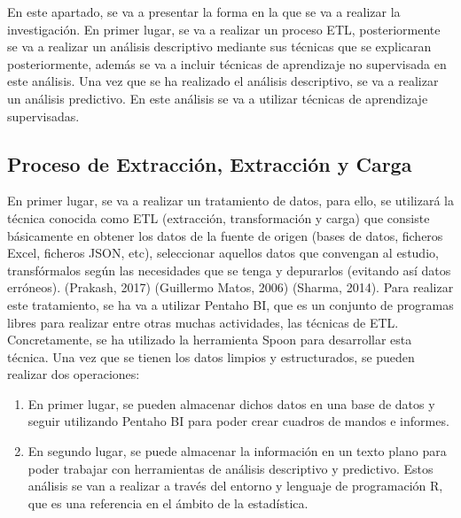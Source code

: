 \documentclass[spanish,12pt, a4paper,twoside]{paper}
\begin{document}

\justify
En este apartado, se va a presentar la forma en la que se va a realizar la investigación. En primer lugar, se va a realizar un proceso ETL, posteriormente se va a realizar un análisis descriptivo mediante sus técnicas que se explicaran posteriormente, además se va a incluir técnicas de aprendizaje no supervisada en este análisis.
Una vez que se ha realizado el análisis descriptivo, se va a realizar un análisis predictivo. En este análisis se va a utilizar técnicas de aprendizaje supervisadas.

\subsection{Proceso de Extracción, Extracción y Carga}
\justify
En primer lugar, se va a realizar un tratamiento de datos, para ello, se utilizará la técnica conocida como ETL (extracción, transformación y carga) que consiste básicamente en obtener los datos de la fuente de origen (bases de datos, ficheros Excel, ficheros JSON, etc), seleccionar aquellos datos que convengan al estudio, transfórmalos según las necesidades que se tenga y depurarlos (evitando así datos erróneos). (Prakash, 2017) (Guillermo Matos, 2006) (Sharma, 2014).
Para realizar este tratamiento, se ha va a utilizar Pentaho BI, que es un conjunto de programas libres para realizar entre otras muchas actividades, las técnicas de ETL. Concretamente, se ha utilizado la herramienta Spoon para desarrollar esta técnica. 
Una vez que se tienen los datos limpios y estructurados, se pueden realizar dos operaciones:
\justify
\begin{enumerate}
\item  En primer lugar, se pueden almacenar dichos datos en una base de datos y seguir utilizando Pentaho BI para poder crear cuadros de mandos e informes. 
\item  En segundo lugar, se puede almacenar la información en un texto plano para poder trabajar con herramientas de análisis descriptivo y predictivo. Estos análisis se van a realizar a través del entorno y lenguaje de programación R, que es una referencia en el ámbito de la estadística.
\end{enumerate}
\end{document}
